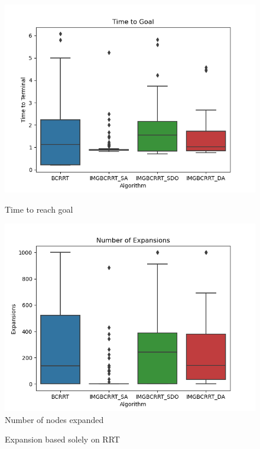\documentclass{article}
\begin{document}

\begin{figure}[h]
	\centering
\begin{minipage}{.5\textwidth}
\centering
	\includegraphics[width=.9\linewidth]{TTG1.png}
        \caption{Time to reach goal}
\end{minipage}%
\begin{minipage}{.5\textwidth}
\centering
	\includegraphics[width=.9\linewidth]{Expans1.png}
        \caption{Number of nodes expanded}
\end{minipage}

\end{figure}

\begin{figure}[h]
        \caption{Expansion based solely on RRT}
\end{figure}
\end{document}

